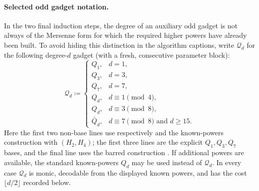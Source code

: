 \paragraph{Selected odd gadget notation.}
In the two final induction steps, the degree of an auxiliary odd gadget is
not always of the Mersenne form for which the required higher powers have
already been built.  To avoid hiding this distinction in the algorithm
captions, write $\mathcal Q_d$ for the following degree-$d$ gadget (with a
fresh, consecutive parameter block):
\[
\mathcal Q_d\coloneqq
\begin{cases}
 Q_1, & d=1,\\
 Q_3, & d=3,\\
 Q_7, & d=7,\\
 Q_d, & d\equiv1\pmod4,\\
 Q_d, & d\equiv3\pmod8,\\
 \bar Q_d, & d\equiv7\pmod8\text{ and }d\ge15.
\end{cases}
\]
Here the first two non-base lines use respectively
 and the known-powers construction with
$(H_2,H_4)$; the first three lines are the explicit $Q_1,Q_3,Q_7$ bases,
and the final line uses the barred construction
.  If additional powers are available, the
standard known-powers $Q_d$ may be used instead of $\mathcal Q_d$.
In every case $\mathcal Q_d$ is monic, decodable from the displayed known
powers, and has the cost $\lfloor d/2\rfloor$ recorded below.

